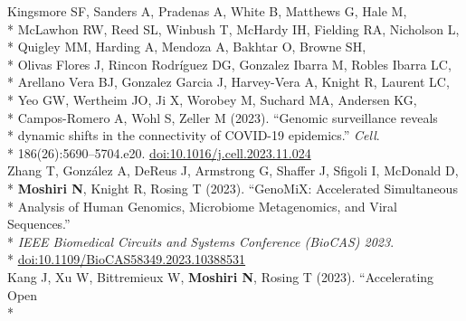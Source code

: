 \documentclass[margin,line]{res}
\begin{document}
\begin{resume}
\hspace*{9mm} Kingsmore SF, Sanders A, Pradenas A, White B, Matthews G, Hale M,\\*
\hspace*{9mm} McLawhon RW, Reed SL, Winbush T, McHardy IH, Fielding RA, Nicholson L,\\*
\hspace*{9mm} Quigley MM, Harding A, Mendoza A, Bakhtar O, Browne SH,\\*
\hspace*{9mm} Olivas Flores J, Rincon Rodríguez DG, Gonzalez Ibarra M, Robles Ibarra LC,\\*
\hspace*{9mm} Arellano Vera BJ, Gonzalez Garcia J, Harvey-Vera A, Knight R, Laurent LC,\\*
\hspace*{9mm} Yeo GW, Wertheim JO, Ji X, Worobey M, Suchard MA, Andersen KG,\\*
\hspace*{9mm} Campos-Romero A, Wohl S, Zeller M (2023). ``Genomic surveillance reveals\\*
\hspace*{9mm} dynamic shifts in the connectivity of COVID-19 epidemics.'' \textit{Cell}.\\*\vspace{2mm}
\hspace*{8mm} 186(26):5690--5704.e20. \href{https://doi.org/10.1016/j.cell.2023.11.024}{doi:10.1016/j.cell.2023.11.024}\\
\hspace*{4mm} Zhang T, Gonz\'alez A, DeReus J, Armstrong G, Shaffer J, Sfigoli I, McDonald D,\\*
\hspace*{9mm} \textbf{Moshiri N}, Knight R, Rosing T (2023). ``GenoMiX: Accelerated Simultaneous\\*
\hspace*{9mm} Analysis of Human Genomics, Microbiome Metagenomics, and Viral Sequences.''\\*
\hspace*{9mm} \textit{IEEE Biomedical Circuits and Systems Conference (BioCAS) 2023}.\\*\vspace{2mm}
\hspace*{7mm} \href{https://doi.org/10.1109/BioCAS58349.2023.10388531}{doi:10.1109/BioCAS58349.2023.10388531}\\
\hspace*{4mm} Kang J, Xu W, Bittremieux W, \textbf{Moshiri N}, Rosing T (2023). ``Accelerating Open\\*

\end{resume}
\end{document}
